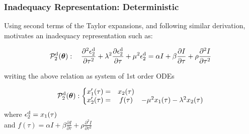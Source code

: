 \documentclass[10pt,xcolor=dvipsnames,compress]{beamer}
\begin{document}
\begin{frame}
\frametitle{Inadequacy Representation: Deterministic}
\vfill


Using second terms of the Taylor expansions, and following similar derivation, motivates an inadequacy representation such as:

\begin{problock}{}

\begin{equation*}
\mathcal{P}_2^{\rm d}(\boldsymbol{\theta}) : \quad
\frac{\partial^2\epsilon_2^{\rm d}}{\partial\tau^2} + \lambda^2\frac{\partial\epsilon_2^{\rm d}}{\partial\tau} + \mu^2\epsilon_2
^{\rm d} =  \alpha I + \beta \frac{\partial I}{\partial\tau} + 
\rho \frac{\partial^2 I}{\partial\tau^2}
\end{equation*}

\end{problock}

writing the above relation as system of 1st order ODEs

\begin{problock}{}

\begin{equation*}
\mathcal{P}_2^{\rm d}(\boldsymbol{\theta}) :\left\{\begin{matrix}
 x_1'(\tau) = & x_2(\tau) &\\ 
x_2'(\tau) = & f(\tau) &-\mu^2 x_1(\tau) - \lambda^2 x_2(\tau)
\end{matrix}\right.
\end{equation*}
where $\epsilon_2^{\rm d} = x_1(\tau)$ \\
and
$f(\tau) = \alpha I + \beta \frac{\partial I}{\partial \tau} + \rho \frac{\partial^2 I}{\partial \tau^2}$
\end{problock}


\vfill
\end{frame}
\end{document}
